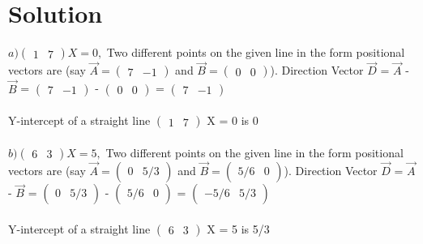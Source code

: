 \documentclass[journal,12pt,twocolumn]{IEEEtran}
\begin{document}
\section{Solution}
$
a) \begin{pmatrix} 1 & 7\end{pmatrix} X = 0,
$
Two different points on the given line in the form positional vectors are (say $\overrightarrow{A} = \begin{pmatrix} 7 & -1\end{pmatrix} $ and $\overrightarrow{B} = \begin{pmatrix} 0 & 0 \end{pmatrix} $).
Direction Vector $\overrightarrow{D}$ = $\overrightarrow{A}$ - $\overrightarrow{B}$ = $\begin{pmatrix} 7 & -1 \end{pmatrix} $ - $\begin{pmatrix} 0 & 0 \end{pmatrix} $ = $\begin{pmatrix} 7 & -1 \end{pmatrix} $
\\
\\
Y-intercept of a straight line $\begin{pmatrix} 1 & 7\end{pmatrix}$ X = 0 is 0
\\
\\
$
b) \begin{pmatrix} 6 & 3\end{pmatrix} X = 5,
$
Two different points on the given line in the form positional vectors are (say $\overrightarrow{A} = \begin{pmatrix} 0 & 5/3 \end{pmatrix} $ and $\overrightarrow{B} = \begin{pmatrix} 5/6 & 0 \end{pmatrix} $).
Direction Vector $\overrightarrow{D}$ = $\overrightarrow{A}$ - $\overrightarrow{B}$ = $\begin{pmatrix} 0 & 5/3 \end{pmatrix} $ - $\begin{pmatrix} 5/6 & 0 \end{pmatrix} $ = $\begin{pmatrix} -5/6 & 5/3 \end{pmatrix} $
\\
\\
Y-intercept of a straight line $\begin{pmatrix} 6 & 3\end{pmatrix}$ X = 5 is 5/3
\end{document}
